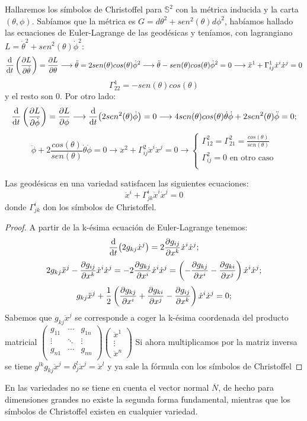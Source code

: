 \documentclass[palatino, bibnumbers]{apuntes}
\begin{document}
\begin{example} Hallaremos los símbolos de Christoffel para $\mathbb{S}^2$ con la métrica inducida y la carta $(\theta,\phi)$.
Sabíamos que la métrica es $G=d\theta^2+sen^2(\theta)d\phi^2$, habíamos hallado las ecuaciones de Euler-Lagrange de las geodésicas y teníamos, con lagrangiano $L=\dot{\theta}^2+sen^2(\theta)\dot{\phi}^2$: $$\dv{t}\left(\pdv{L}{\dot{\theta}}\right)=\pdv{L}{\theta}\longrightarrow\ddot{\theta}=2sen(\theta)cos(\theta)\dot{\phi}^2\longrightarrow\ddot{\theta}-sen(\theta)cos(\theta)\dot{\phi}^2=0\longrightarrow\ddot{x}^1+\Gamma^1_{ij}\dot{x}^i\dot{x}^j=0$$
$$\Gamma^1_{22}=-sen(\theta)cos(\theta)$$ y el resto son 0. Por otro lado:
$$\dv{t}\left(\pdv{L}{\dot{\phi}}\right)=\pdv{L}{\phi}\longrightarrow\dv{t}(2sen^2(\theta)\dot{\phi})=0\longrightarrow4sen(\theta)cos(\theta)\dot{\theta}\dot{\phi}+2sen^2(\theta)\ddot{\phi}=0;$$$$\ddot{\phi}+2\frac{cos(\theta)}{sen(\theta)}\dot{\theta}\dot{\phi}=0\longrightarrow\ddot{x}^2+\Gamma^2_{ij}\dot{x}^i\dot{x}^j=0\longrightarrow\begin{cases}
\Gamma^2_{12}=\Gamma^2_{21}=\frac{cos(\theta)}{sen(\theta)}\\
\Gamma^2_{ij}=0 \text{ en otro caso}\\
\end{cases}$$
\end{example}
\begin{prop}Las geodésicas en una variedad satisfacen las siguientes ecuaciones:
\begin{equation}
\ddot{x}^i+\Gamma^i_{jk}\dot{x}^i\dot{x}^j=0
\end{equation}
donde $\Gamma^i_{jk}$ don los símbolos de Christoffel.
\end{prop}
\begin{proof} A partir de la k-ésima ecuación de Euler-Lagrange tenemos: $$\dv{t}(2g_{kj}\dot{x}^j)=2\pdv{g_{ij}}{x^k}\dot{x}^i\dot{x}^j;$$
	$$2g_{kj}\ddot{x}^j-\pdv{g_{ij}}{x^k}\dot{x}^i\dot{x}^j=-2\pdv{g_{kj}}{x^i}\dot{x}^i\dot{x}^j=\left(-\pdv{g_{kj}}{x^i}-\pdv{g_{ki}}{x^j}\right)\dot{x}^i\dot{x}^j;$$$$g_{kj}\ddot{x}^j+\frac{1}{2}\left(\pdv{g_{kj}}{x^i}+\pdv{g_{ki}}{x^j}-\pdv{g_{ij}}{x^k}\right)\dot{x}^i\dot{x}^j=0;$$
	Sabemos que $g_{kj}\ddot{x}^j$ se corresponde a coger la k-ésima coordenada del producto matricial $\begin{pmatrix}g_{11}&\cdots&g_{1n}\\\vdots&\ddots&\vdots\\g_{n1}&\cdots&g_{nn}\\\end{pmatrix}\begin{pmatrix}\ddot{x}^1\\\vdots\\\ddot{x}^n\end{pmatrix}$ Si ahora multiplicamos por la matriz inversa se tiene $g^{lk}g_{kj}\ddot{x}^j=\delta^l_j\ddot{x}^j=\ddot{x}^l$ y ya sale la fórmula con los símbolos de Christoffel
\end{proof}
En las variedades no se tiene en cuenta el vector normal $\overline{N}$, de hecho para dimensiones grandes no existe la segunda forma fundamental, mientras que los símbolos de Christoffel existen en cualquier variedad.
\end{document}
